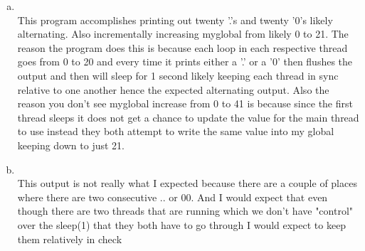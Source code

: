 \documentclass{article}
\begin{document}
\begin{enumerate}[a)]
	\item \hfill \\
	This program accomplishes printing out twenty '.'s and twenty '0's likely alternating. Also incrementally increasing myglobal from likely 0 to 21. The reason the program does this is because each loop in each respective thread goes from 0 to 20 and every time it prints either a '.' or a '0' then flushes the output and then will sleep for 1 second likely keeping each thread in sync relative to one another hence the expected alternating output. Also the reason you don't see myglobal increase from 0 to 41 is because since the first thread sleeps it does not get a chance to update the value for the main thread to use instead they both attempt to write the same value into my global keeping down to just 21.
	\item \hfill \\
		This output is not really what I expected because there are a couple of places where there are two consecutive .. or 00. And I would expect that even though there are two threads that are running which we don't have "control" over the sleep(1) that they both have to go through I would expect to keep them relatively in check
\end{enumerate}
\end{document}
